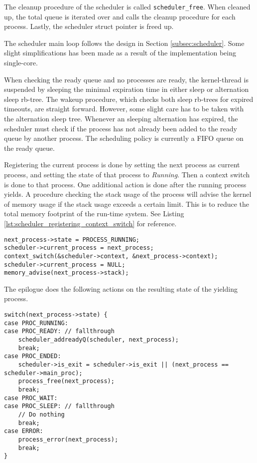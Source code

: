 The cleanup procedure of the scheduler is called \texttt{scheduler\_free}. When cleaned up, the total queue is iterated over and calls the cleanup procedure for each process. Lastly, the scheduler struct pointer is freed up. 

The scheduler main loop follows the design in Section \ref{subsec:scheduler}. Some slight simplifications has been made as a result of the implementation being single\hyp{}core. 

When checking the ready queue and no processes are ready, the kernel\hyp{}thread is suspended by sleeping the minimal expiration time in either sleep or alternation sleep rb\hyp{}tree. The wakeup procedure, which checks both sleep rb\hyp{}trees for expired timeouts, are straight forward. However, some slight care has to be taken with the alternation sleep tree. Whenever an sleeping alternation has expired, the scheduler must check if the process has not already been added to the ready queue by another process. The scheduling policy is currently a FIFO queue on the ready queue. 

Registering the current process is done by setting the next process as current process, and setting the state of that process to \textit{Running}. Then a context switch is done to that process. One additional action is done after the running process yields. A procedure checking the stack usage of the process will advise the kernel of memory usage if the stack usage exceeds a certain limit. This is to reduce the total memory footprint of the run\hyp{}time system. See Listing \ref{lst:scheduler_registering_context_switch} for reference.

\begin{lstlisting}[style={CustomC},caption={Scheduler registering and context switch to running process},label={lst:scheduler_registering_context_switch}]
next_process->state = PROCESS_RUNNING;
scheduler->current_process = next_process;
context_switch(&scheduler->context, &next_process->context);
scheduler->current_process = NULL;
memory_advise(next_process->stack);
\end{lstlisting}

The epilogue does the following actions on the resulting state of the yielding process. 

\begin{lstlisting}[style={CustomC},caption={Handling of process state in epilogue},label={lst:process_state_epilogue}]
switch(next_process->state) {
case PROC_RUNNING:
case PROC_READY: // fallthrough
    scheduler_addreadyQ(scheduler, next_process);
    break;
case PROC_ENDED:
    scheduler->is_exit = scheduler->is_exit || (next_process == scheduler->main_proc);
    process_free(next_process);
    break;
case PROC_WAIT:
case PROC_SLEEP: // fallthrough
    // Do nothing
    break;
case ERROR:
    process_error(next_process);
    break;
}
\end{lstlisting}


